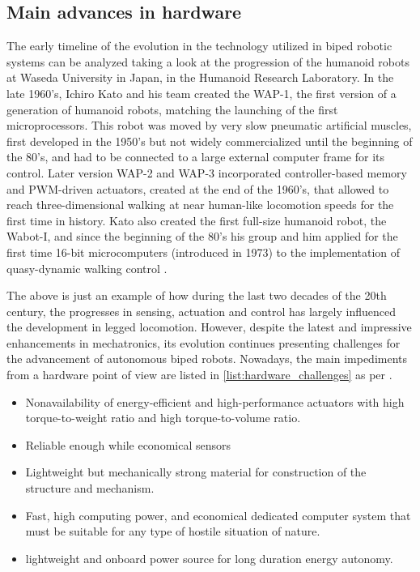\subsection{Main advances in hardware} %
\label{sub:the_advances_in_hardware}
The early timeline of the evolution in the technology utilized in biped robotic systems can be analyzed taking a look at the progression of the humanoid robots at Waseda University in Japan, in the Humanoid Research Laboratory.
In the late 1960's, Ichiro Kato and his team created the WAP-1, the first version of a generation of humanoid robots, matching the launching of the first microprocessors.
This robot was moved by very slow pneumatic artificial muscles, first developed in the 1950's but not widely commercialized until the beginning of the 80's, and had to be connected to a large external computer frame for its control. 
Later version WAP-2 and WAP-3 incorporated controller-based memory and PWM-driven actuators, created at the end of the 1960's, that allowed to reach three-dimensional walking at near human-like locomotion speeds for the first time in history.
Kato also created the first full-size humanoid robot, the Wabot-I, and since the beginning of the 80's his group and him applied for the first time 16-bit microcomputers (introduced in 1973) to the implementation of quasy-dynamic walking control \cite{biped_robots_history}.

The above is just an example of how during the last two decades of the 20th century, the progresses in sensing, actuation and control has largely influenced the development in legged locomotion.
However, despite the latest and impressive enhancements in mechatronics, its evolution continues presenting challenges for the advancement of autonomous biped robots.
Nowadays, the main impediments from a hardware point of view are listed in \ref{list:hardware_challenges} as per \cite{biped_robots_history}.

\begin{itemize}
	\item Nonavailability of energy-efficient and high-performance actuators with high torque-to-weight ratio and high torque-to-volume ratio.
	\item Reliable enough while economical sensors
	\item Lightweight but mechanically strong material for construction of the structure and mechanism.
	\item Fast, high computing power, and economical dedicated computer system that must be suitable for any type of hostile situation of nature.
	\item lightweight and onboard power source for long duration energy autonomy.
\label{list:hardware_challenges}
\end{itemize}





